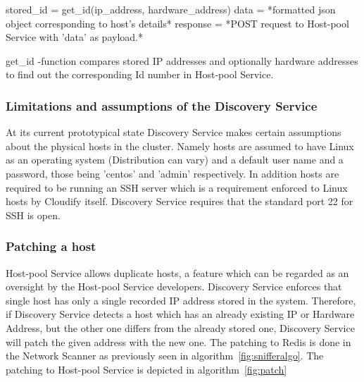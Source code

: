 \begin{center}
\begin{algorithm}[H]
\label{fig:addhost}
\begin{center}
\end{center}
{
stored\_id = get\_id(ip\_address, hardware\_address)
 {
	data = *formatted json object corresponding to host's details*\;
	response = *POST request to Host-pool Service with 'data' as payload.*\;
} 
}

\caption{get\_id -function compares stored IP addresses and optionally hardware addresses to find out the corresponding Id number in Host-pool Service.}
\end{algorithm}
\end{center}

\subsubsection{Limitations and assumptions of the Discovery Service}

At its current prototypical state Discovery Service makes certain assumptions about the physical hosts in the cluster.
Namely hosts are assumed to have Linux as an operating system (Distribution can vary) and a default user name and a password, those being 'centos' and 'admin' respectively. In addition hosts are required to be running an SSH server which is a requirement enforced to Linux hosts by Cloudify itself. Discovery Service requires that the standard port 22 for SSH is open.

\subsubsection{Patching a host}

Host-pool Service allows duplicate hosts, a feature which can be regarded as an oversight by the Host-pool Service developers. Discovery Service enforces that single host has only a single recorded IP address stored in the system. Therefore, if Discovery Service detects a host which has an already existing IP or Hardware Address, but the other one differs from the already stored one, Discovery Service will patch the given address with the new one. The patching to Redis is done in the Network Scanner as previously seen in algorithm~\ref{fig:snifferalgo}. The patching to Host-pool Service is depicted in algorithm~\ref{fig:patch}


